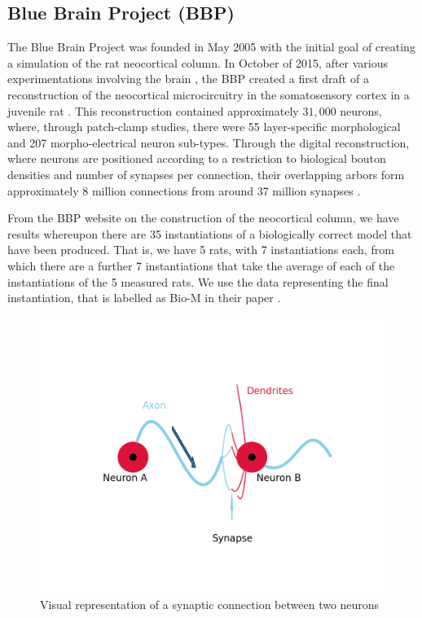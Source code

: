 \subsection{Blue Brain Project (BBP)}
The Blue Brain Project was founded in May 2005 with the initial goal of creating a simulation of the rat neocortical column. In October of 2015, after various experimentations involving the brain \cite{2013}, the BBP created a first draft of a reconstruction of the neocortical microcircuitry in the somatosensory cortex in a juvenile rat \cite{2015}. This reconstruction contained approximately $31,000$ neurons, where, through patch-clamp studies, there were 55 layer-specific morphological and 207 morpho-electrical neuron sub-types. Through the digital reconstruction, where neurons are positioned according to a restriction to biological bouton densities and number of synapses per connection, their overlapping arbors form approximately 8 million connections from around 37 million synapses \cite{2015}. 

From the BBP website on the construction of the neocortical column, we have results whereupon there are 35 instantiations of a biologically correct model that have been produced. That is, we have 5 rats, with 7 instantiations each, from which there are a further 7 instantiations that take the average of each of the instantiations of the 5 measured rats. We use the data representing the final instantiation, that is labelled as Bio-M in their paper \cite{Reimann_2017}.
\begin{figure}[H]
\begin{center}
\captionsetup{justification=centering}
\includegraphics[width=12cm]{graph/cell.png}
\caption{Visual representation of a synaptic connection between two neurons}
\end{center}
\end{figure}
